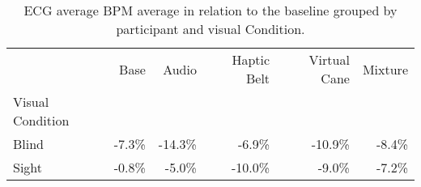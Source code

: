 
\begin{table}[!htb]
\centering
\caption{ECG average BPM average in relation to the baseline grouped by participant and visual Condition.}
\label{tab:ecg_bpm_average_group}
\begin{tabular}{lrrrrr}
\toprule
{} &    Base &    Audio & Haptic Belt & Virtual Cane & Mixture \\
Visual Condition &         &          &             &              &         \\
\midrule
Blind            &  -7.3\% &  -14.3\% &      -6.9\% &      -10.9\% &  -8.4\% \\
Sight            &  -0.8\% &   -5.0\% &     -10.0\% &       -9.0\% &  -7.2\% \\
\bottomrule
\end{tabular}
\end{table}

